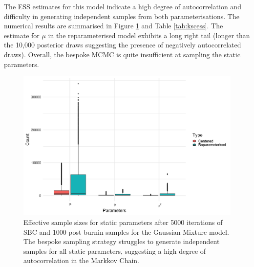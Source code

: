 \documentclass[12pt, a4paper]{article}
\begin{document}
    The ESS estimates for this model indicate a high degree of autocorrelation and difficulty in generating independent samples from both parameterisations. The numerical results are summarised in Figure \ref{fig:kscess} and Table \ref{tab:kscess}. The estimate for $\mu$ in the reparameterised model exhibits a long right tail (longer than the 10,000 posterior draws suggesting the presence of negatively autocorrelated draws). Overall, the bespoke MCMC is quite insufficient at sampling the static parameters. 
    


    \begin{figure}[H]
        \centering
        \includegraphics[scale=0.1]{results/ksc_ess.png}
        \caption{Effective sample sizes for static parameters after 5000 iterations of SBC and 1000 post burnin samples for the Gaussian Mixture model. The bespoke sampling strategy struggles to generate independent samples for all static parameters, suggesting a high degree of autocorrelation in the Markkov Chain.}
        \label{fig:kscess}
    \end{figure}
\end{document}
